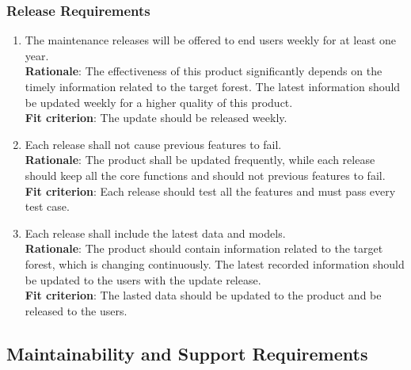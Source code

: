 \documentclass{article}
\begin{document}
\subsubsection{Release Requirements}
\begin{enumerate}[OE4.1]
    \item The maintenance releases will be offered to end users weekly for at least one year.\\
    \textbf{Rationale}: The effectiveness of this product significantly depends on the timely information related to the target forest. The latest information should be updated weekly for a higher quality of this product.\\
    \textbf{Fit criterion}: The update should be released weekly.\\
    \item Each release shall not cause previous features to fail. \\
    \textbf{Rationale}: The product shall be updated frequently, while each release should keep all the core functions and should not previous features to fail.\\
    \textbf{Fit criterion}: Each release should test all the features and must pass every test case.\\
    \item Each release shall include the latest data and models. \\
    \textbf{Rationale}: The product should contain information related to the target forest, which is changing continuously. The latest recorded information should be updated to the users with the update release.\\
    \textbf{Fit criterion}: The lasted data should be updated to the product and be released to the users. \\
\end{enumerate}
\subsection{Maintainability and Support Requirements}
\end{document}
